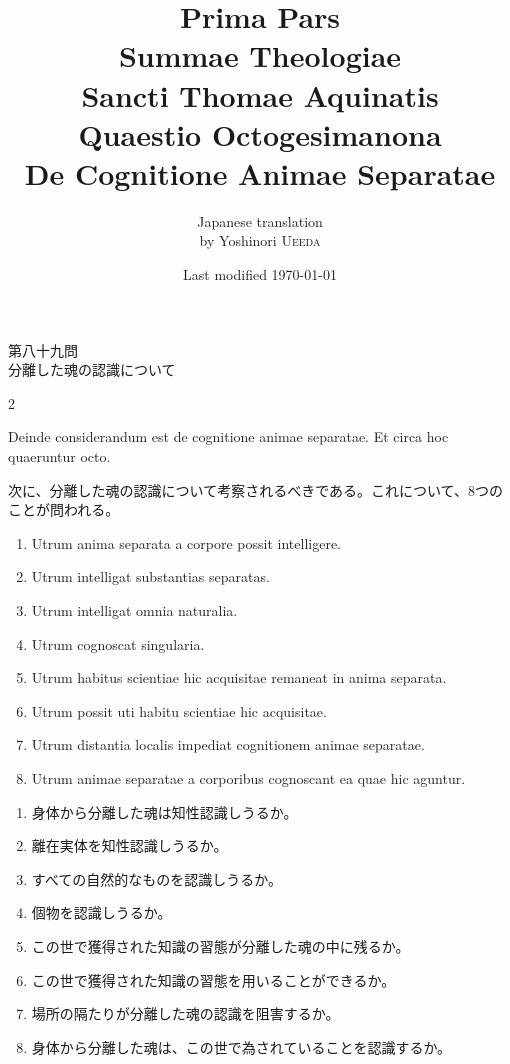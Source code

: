 \documentclass[paper=a4paper,fontsize=10pt,jafontsize=9pt,titlepage]{jlreq}
\title{{\bfseries Prima Pars}\\{\Huge Summae Theologiae}\\Sancti Thomae
Aquinatis\\{\sffamily Quaestio Octogesimanona}\\{\bfseries De Cognitione Animae Separatae}}
\author{Japanese translation\\by Yoshinori {\scshape Ueeda}}
\date{Last modified \today}
\begin{document}
\maketitle

\begin{center}
{\Large 第八十九問\\
分離した魂の認識について}
\end{center}


\begin{paracol}{2}

Deinde considerandum est de cognitione animae separatae. Et circa hoc
quaeruntur octo.

\switchcolumn

次に、分離した魂の認識について考察されるべきである。これについて、8つの
 ことが問われる。

\switchcolumn*

\begin{enumerate}
 \item Utrum anima separata a corpore possit
intelligere.
 \item Utrum intelligat substantias separatas. 
 \item Utrum intelligat omnia naturalia. 
 \item Utrum cognoscat
singularia. 
 \item Utrum habitus scientiae hic acquisitae remaneat in
anima separata. 
 \item Utrum possit uti habitu scientiae hic
acquisitae. 
 \item Utrum distantia localis impediat cognitionem animae
separatae. 
 \item Utrum animae separatae a corporibus cognoscant ea
quae hic aguntur.
\end{enumerate}

\switchcolumn

\begin{enumerate}
 \item 身体から分離した魂は知性認識しうるか。
 \vspace{4ex}
 \item 離在実体を知性認識しうるか。
 \item すべての自然的なものを認識しうるか。
 \item 個物を認識しうるか。
 \item この世で獲得された知識の習態が分離した魂の中に残るか。
 \item この世で獲得された知識の習態を用いることができるか。
 \item 場所の隔たりが分離した魂の認識を阻害するか。
 \item 身体から分離した魂は、この世で為されていることを認識するか。
\end{enumerate}

\end{paracol}
\end{document}

